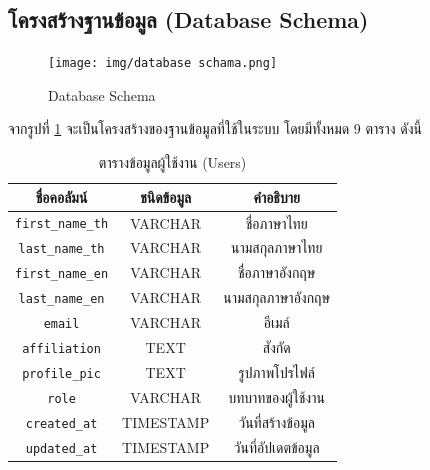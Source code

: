 \newpage
\subsection{โครงสร้างฐานข้อมูล (Database Schema)}
\begin{figure}[hb]
    \begin{center}
        \texttt{[image: img/database schama.png]}
    \end{center}
    \caption{Database Schema}
    \label{fig:data_schema}
\end{figure}
จากรูปที่ \ref{fig:data_schema} จะเป็นโครงสร้างของฐานข้อมูลที่ใช้ในระบบ โดยมีทั้งหมด 9  ตาราง ดังนี้


\begin{table}[hb]
    \centering
    \begin{tabular}{|c|c|c|}
        \hline
        ชื่อคอลัมน์               & ชนิดข้อมูล   & คำอธิบาย          \\ \hline
        \verb |first_name_th| & VARCHAR   & ชื่อภาษาไทย       \\ \hline
        \verb |last_name_th|  & VARCHAR   & นามสกุลภาษาไทย   \\ \hline
        \verb |first_name_en| & VARCHAR   & ชื่อภาษาอังกฤษ     \\ \hline
        \verb |last_name_en|  & VARCHAR   & นามสกุลภาษาอังกฤษ \\ \hline
        \verb |email|         & VARCHAR   & อีเมล์            \\ \hline
        \verb |affiliation|   & TEXT      & สังกัด            \\ \hline
        \verb |profile_pic|   & TEXT      & รูปภาพโปรไฟล์     \\ \hline
        \verb |role|          & VARCHAR   & บทบาทของผู้ใช้งาน  \\ \hline
        \verb |created_at|    & TIMESTAMP & วันที่สร้างข้อมูล     \\ \hline
        \verb |updated_at|    & TIMESTAMP & วันที่อัปเดตข้อมูล    \\ \hline
    \end{tabular}
    \caption{ตารางข้อมูลผู้ใช้งาน (Users)}
    \label{tab:user_data}
\end{table}

